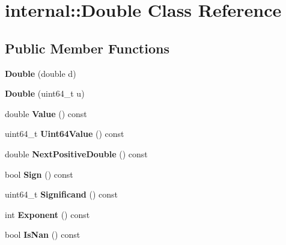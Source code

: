 \hypertarget{a00078}{}\section{internal\+:\+:Double Class Reference}
\label{a00078}
\subsection*{Public Member Functions}
\begin{DoxyCompactItemize}
\item 
{\bfseries Double} (double d)\hypertarget{a00078_ad66f3b914570ce62e9f16083117f3e4f}{}\label{a00078_ad66f3b914570ce62e9f16083117f3e4f}

\item 
{\bfseries Double} (uint64\+\_\+t u)\hypertarget{a00078_a293a7ca841d847ea3e83ffa28b68601f}{}\label{a00078_a293a7ca841d847ea3e83ffa28b68601f}

\item 
double {\bfseries Value} () const \hypertarget{a00078_af35ab8a9e1ee41b1fd8a97d5899cfa1d}{}\label{a00078_af35ab8a9e1ee41b1fd8a97d5899cfa1d}

\item 
uint64\+\_\+t {\bfseries Uint64\+Value} () const \hypertarget{a00078_a9b9f08386be36634cc79f2e9427517f9}{}\label{a00078_a9b9f08386be36634cc79f2e9427517f9}

\item 
double {\bfseries Next\+Positive\+Double} () const \hypertarget{a00078_a3da449454b6b7e7108ed1b9a00625b68}{}\label{a00078_a3da449454b6b7e7108ed1b9a00625b68}

\item 
bool {\bfseries Sign} () const \hypertarget{a00078_ad3f4421a50d77c3af20638a12ec8f168}{}\label{a00078_ad3f4421a50d77c3af20638a12ec8f168}

\item 
uint64\+\_\+t {\bfseries Significand} () const \hypertarget{a00078_a8c3f5cf8152af8588d32530238c35aad}{}\label{a00078_a8c3f5cf8152af8588d32530238c35aad}

\item 
int {\bfseries Exponent} () const \hypertarget{a00078_a39aa84d5dc24cf22ca44578fab515f44}{}\label{a00078_a39aa84d5dc24cf22ca44578fab515f44}

\item 
bool {\bfseries Is\+Nan} () const \hypertarget{a00078_a5c1ad93b8c866afdd5c2b412ef7bea98}{}\label{a00078_a5c1ad93b8c866afdd5c2b412ef7bea98}


\end{DoxyCompactItemize}
